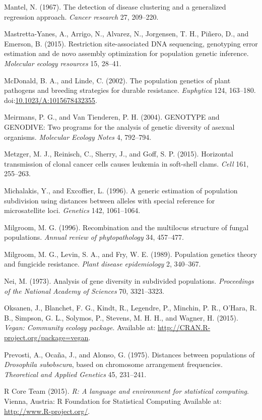 \documentclass{frontiersSCNS} %
\begin{document}
Mantel, N. (1967). The detection of disease clustering and a generalized
regression approach. \emph{Cancer research} 27, 209--220.

Mastretta-Yanes, A., Arrigo, N., Alvarez, N., Jorgensen, T. H.,
Pi{ñ}ero, D., and Emerson, B. (2015). Restriction site-associated DNA
sequencing, genotyping error estimation and de novo assembly
optimization for population genetic inference. \emph{Molecular ecology
resources} 15, 28--41.

McDonald, B. A., and Linde, C. (2002). The population genetics of plant
pathogens and breeding strategies for durable resistance.
\emph{Euphytica} 124, 163--180.
doi:\href{http://dx.doi.org/10.1023/A:1015678432355}{10.1023/A:1015678432355}.

Meirmans, P. G., and Van Tienderen, P. H. (2004). GENOTYPE and GENODIVE:
Two programs for the analysis of genetic diversity of asexual organisms.
\emph{Molecular Ecology Notes} 4, 792--794.

Metzger, M. J., Reinisch, C., Sherry, J., and Goff, S. P. (2015).
Horizontal transmission of clonal cancer cells causes leukemia in
soft-shell clams. \emph{Cell} 161, 255--263.

Michalakis, Y., and Excoffier, L. (1996). A generic estimation of
population subdivision using distances between alleles with special
reference for microsatellite loci. \emph{Genetics} 142, 1061--1064.

Milgroom, M. G. (1996). Recombination and the multilocus structure of
fungal populations. \emph{Annual review of phytopathology} 34, 457--477.

Milgroom, M. G., Levin, S. A., and Fry, W. E. (1989). Population
genetics theory and fungicide resistance. \emph{Plant disease
epidemiology} 2, 340--367.

Nei, M. (1973). Analysis of gene diversity in subdivided populations.
\emph{Proceedings of the National Academy of Sciences} 70, 3321--3323.

Oksanen, J., Blanchet, F. G., Kindt, R., Legendre, P., Minchin, P. R.,
O'Hara, R. B., Simpson, G. L., Solymos, P., Stevens, M. H. H., and
Wagner, H. (2015). \emph{Vegan: Community ecology package}. Available
at: \url{http://CRAN.R-project.org/package=vegan}.

Prevosti, A., Oca{ñ}a, J., and Alonso, G. (1975). Distances between
populations of \emph{Drosophila subobscura}, based on chromosome
arrangement frequencies. \emph{Theoretical and Applied Genetics} 45,
231--241.

R Core Team (2015). \emph{R: A language and environment for statistical
computing}. Vienna, Austria: R Foundation for Statistical Computing
Available at: \url{http://www.R-project.org/}.
\end{document}
